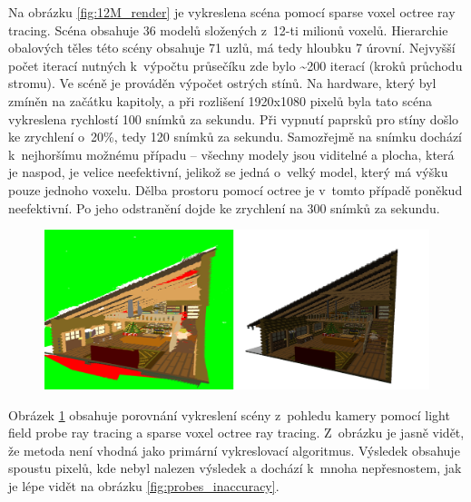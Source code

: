 Na obrázku \ref{fig:12M_render} je vykreslena scéna pomocí sparse voxel octree ray tracing. Scéna obsahuje 36 modelů složených z~12-ti milionů voxelů. Hierarchie obalových těles této scény obsahuje 71 uzlů, má tedy hloubku 7 úrovní. Nejvyšší počet iterací nutných k~výpočtu průsečíku zde bylo \textasciitilde{}200 iterací (kroků průchodu stromu). Ve scéně je prováděn výpočet ostrých stínů. Na hardware, který byl zmíněn na začátku kapitoly, a při rozlišení 1920x1080 pixelů byla tato scéna vykreslena rychlostí 100 snímků za sekundu. Při vypnutí paprsků pro stíny došlo ke zrychlení o~20\%, tedy 120 snímků za sekundu. Samozřejmě na snímku dochází k~nejhoršímu možnému případu -- všechny modely jsou viditelné a plocha, která je naspod, je velice neefektivní, jelikož se jedná o~velký model, který má výšku pouze jednoho voxelu. Dělba prostoru pomocí octree je v~tomto případě poněkud neefektivní.  Po jeho odstranění dojde ke zrychlení na 300 snímků za sekundu.

\begin{figure}[H]
	\centering
	\captionsetup{justification=centering}
	\includegraphics[scale=1]{images/render_probe_vs_svo.png}
	\label{fig:probe_vs_svo_render}
\end{figure}

Obrázek \ref{fig:probe_vs_svo_render} obsahuje porovnání vykreslení scény z~pohledu kamery pomocí light field probe ray tracing a sparse voxel octree ray tracing. Z~obrázku je jasně vidět, že metoda není vhodná jako primární vykreslovací algoritmus. Výsledek obsahuje spoustu pixelů, kde nebyl nalezen výsledek a dochází k~mnoha nepřesnostem, jak je lépe vidět na obrázku \ref{fig:probes_inaccuracy}.

